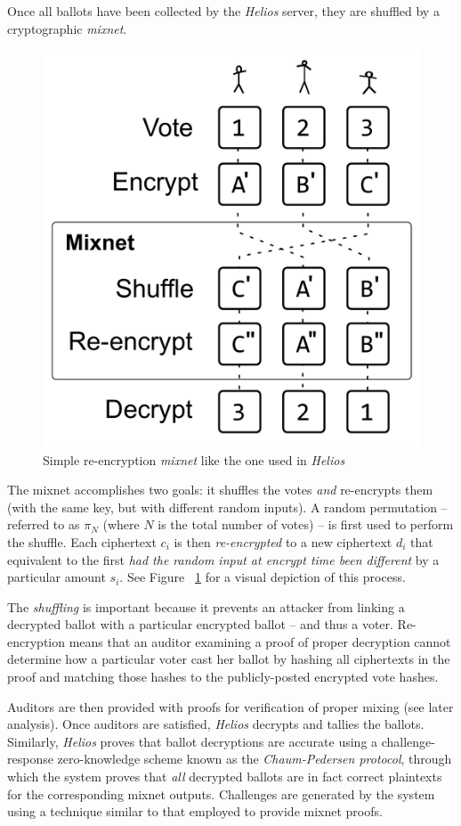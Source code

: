 \documentclass[10pt,twocolumn]{article}
\newcommand{\term}[1]{\textit{#1}}
\begin{document}
Once all ballots have been collected by the \term{Helios} server, they are shuffled by a cryptographic
\term{mixnet}.

\begin{figure}
	\center
	\includegraphics[width=0.8\columnwidth]{images/include/mixnet.pdf}
	\caption{Simple re-encryption \term{mixnet} like the one used in \term{Helios}}
	\label{fig:mixnet}
\end{figure}

The mixnet accomplishes two goals: it shuffles the votes \emph{and} re-encrypts them (with the
same key, but with different random inputs). A random permutation -- referred to as $\pi_{N}$ (where
$N$ is the total number of votes) -- is first used to perform the shuffle. Each ciphertext
$c_{i}$ is then \term{re-encrypted} to a new ciphertext $d_{i}$ that equivalent to the first \emph{had
the random input at encrypt time been different} by a particular amount $s_{i}$. See Figure
~\ref{fig:mixnet} for a visual depiction of this process.

The \term{shuffling} is important because it prevents an attacker from linking a decrypted ballot with
a particular encrypted ballot -- and thus a voter. Re-encryption means that an auditor examining a
proof of proper decryption cannot determine how a particular voter cast her ballot by hashing
all ciphertexts in the proof and matching those hashes to the publicly-posted encrypted vote hashes.

Auditors are then provided with proofs for verification of proper mixing (see later analysis). Once
auditors are satisfied, \term{Helios} decrypts and tallies the ballots. Similarly, \term{Helios}
proves that ballot decryptions are accurate using a challenge-response zero-knowledge scheme
known as the \term{Chaum-Pedersen protocol}, through which the system proves that \emph{all}
decrypted ballots are in fact correct plaintexts for the corresponding mixnet outputs. Challenges
are generated by the system using a technique similar to that employed to provide mixnet proofs.
\end{document}

